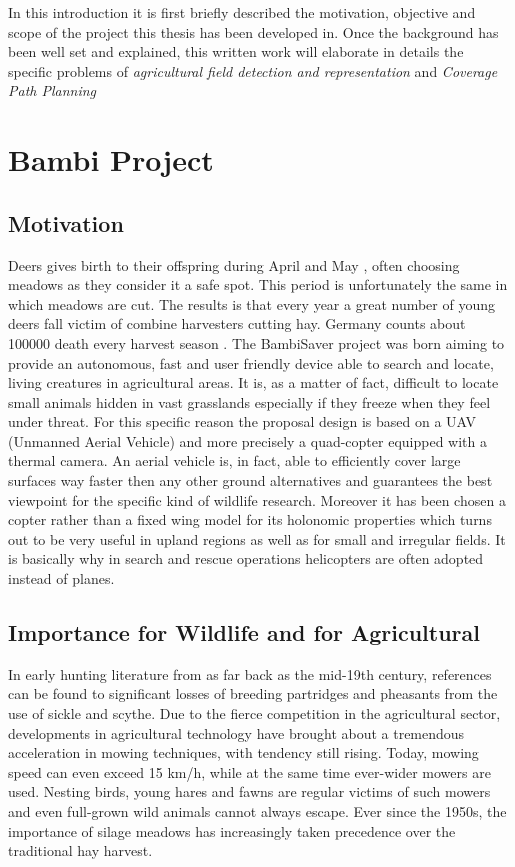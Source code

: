 


In this introduction it is first briefly described the motivation, objective and scope of the project this thesis has been developed in. Once the background has been well set and explained, this written work will elaborate in details the specific problems of \textit{agricultural field detection and representation} and \textit{Coverage Path Planning}
\section{Bambi Project} %
\label{sec:bambi_project}

\subsection{Motivation} %
\label{ssec:motivation}
 Deers gives birth to their offspring during April and May \cite{MowlingMortality}, often choosing meadows as they consider it a safe spot. This period is unfortunately the same in which meadows are cut. The results is that every year a great number of young deers fall victim of combine harvesters cutting hay. Germany counts about 100000 death every harvest season \cite{MowlingMortality}.
 The BambiSaver project was born aiming to provide an autonomous, fast and user friendly device able to search and locate, living creatures in agricultural areas. It is, as a matter of fact, difficult to locate small animals hidden in vast grasslands especially if they freeze when they feel under threat. For this specific reason the proposal design is based on a UAV (Unmanned Aerial Vehicle) \cite{ICAO} and more precisely a quad-copter equipped with a thermal camera.
 An aerial vehicle is, in fact, able to efficiently cover large surfaces way faster then any other ground alternatives and guarantees the best viewpoint for the specific kind of wildlife research. Moreover it has been chosen a copter rather than a fixed wing model for its holonomic properties which turns out to be very useful in upland regions as well as for small and irregular fields. It is basically why in search and rescue operations helicopters are often adopted instead of planes.

\subsection{Importance for Wildlife and for Agricultural}
In early hunting literature from as far back as the mid-19th century, references can be found to significant losses of breeding partridges and pheasants from the use of sickle and scythe. Due to the fierce competition in the agricultural sector, developments in agricultural technology have brought about a tremendous acceleration in mowing techniques, with tendency still rising. Today, mowing speed can even exceed 15 km/h, while at the same time ever-wider mowers are used. Nesting birds, young hares and fawns are regular victims of such mowers and even full-grown wild animals cannot always escape. Ever since the 1950s, the importance of silage meadows has increasingly taken precedence over the traditional hay harvest.

